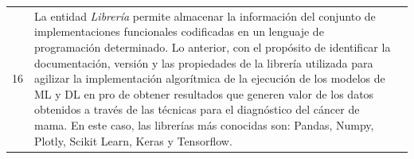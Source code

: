 \begin{table}
	\footnotesize
	\begin{threeparttable}
		\begin{tabular}{p{0.5cm} p{7cm} p{7cm}} \toprule 
			16
			& La entidad \textit{Librería} permite almacenar la información del conjunto de implementaciones funcionales codificadas en un lenguaje de programación determinado. Lo anterior, con el propósito de identificar la documentación, versión y las propiedades de la librería utilizada para agilizar la implementación algorítmica de la ejecución de los modelos de ML y DL en pro de obtener resultados que generen valor de los datos obtenidos a través de las técnicas para el diagnóstico del cáncer de mama. En este caso, las librerías más conocidas son: Pandas, Numpy, Plotly, Scikit Learn, Keras y Tensorflow.
			

\end{tabular}
\end{threeparttable}
\end{table}
